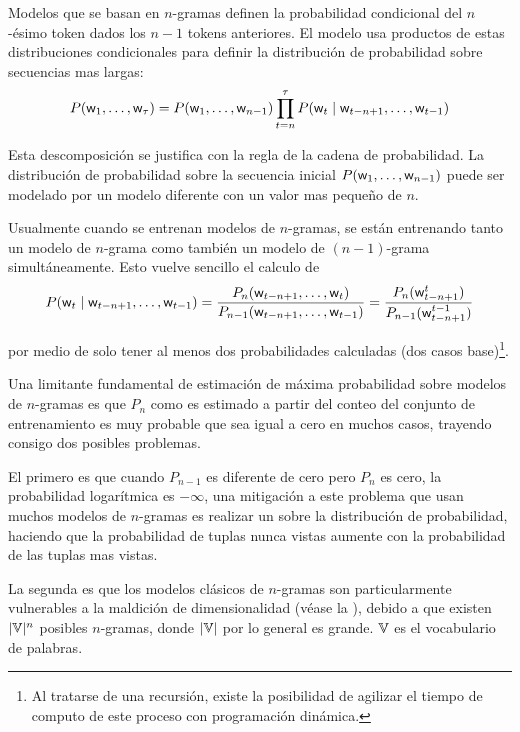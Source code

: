 Modelos que se basan en $n$-gramas definen la probabilidad condicional del $n$-ésimo token dados los $n-1$ tokens anteriores. El modelo usa productos de estas distribuciones condicionales para definir la distribución de probabilidad sobre secuencias mas largas:
\begin{equation}
  P({\mathit{\mathsf{w}}}_1, \ldots, {\mathit{\mathsf{w}}}_\tau) = P({\mathit{\mathsf{w}}}_1, \ldots, {\mathit{\mathsf{w}}}_{n-1}) \prod_{t = n}^{\tau} P({\mathit{\mathsf{w}}}_t \mid {\mathit{\mathsf{w}}}_{t-n+1}, \ldots, {\mathit{\mathsf{w}}}_{t-1})
\end{equation}

Esta descomposición se justifica con la regla de la cadena de probabilidad. La distribución de probabilidad sobre la secuencia inicial $P({\mathit{\mathsf{w}}}_1, \ldots, {\mathit{\mathsf{w}}}_{n-1})$ puede ser modelado por un modelo diferente con un valor mas pequeño de $n$.

Usualmente cuando se entrenan modelos de $n$-gramas, se están entrenando tanto un modelo de $n$-grama como también un modelo de $(n-1)$-grama simultáneamente. Esto vuelve sencillo el calculo de
\begin{equation}
  P({\mathit{\mathsf{w}}}_t \mid {\mathit{\mathsf{w}}}_{t-n+1}, \ldots, {\mathit{\mathsf{w}}}_{t-1}) = \frac{P_n({\mathit{\mathsf{w}}}_{t-n+1}, \ldots, {\mathit{\mathsf{w}}}_t)}{P_{n-1}({\mathit{\mathsf{w}}}_{t-n+1}, \ldots, {\mathit{\mathsf{w}}}_{t-1})} = \frac{P_n({\mathit{\mathsf{w}}}_{t-n+1}^{t})}{P_{n-1}({\mathit{\mathsf{w}}}_{t-n+1}^{t-1})}
\end{equation}

por medio de solo tener al menos dos probabilidades calculadas (dos casos base)\footnote{Al tratarse de una recursión, existe la posibilidad de agilizar el tiempo de computo de este proceso con programación dinámica.}.

Una limitante fundamental de estimación de máxima probabilidad sobre modelos de $n$-gramas es que $P_n$ como es estimado a partir del conteo del conjunto de entrenamiento es muy probable que sea igual a cero en muchos casos, trayendo consigo dos posibles problemas.

El primero es que cuando $P_{n-1}$ es diferente de cero pero $P_n$ es cero, la probabilidad logarítmica es $-\infty$, una mitigación a este problema que usan muchos modelos de $n$-gramas es realizar un  sobre la distribución de probabilidad, haciendo que la probabilidad de tuplas nunca vistas aumente con la probabilidad de las tuplas mas vistas.

La segunda es que los modelos clásicos de $n$-gramas son particularmente vulnerables a la maldición de dimensionalidad (véase la ), debido a que existen $|{\mathbb{V}}|^n$ posibles $n$-gramas, donde $|{\mathbb{V}}|$ por lo general es grande. ${\mathbb{V}}$ es el vocabulario de palabras.


